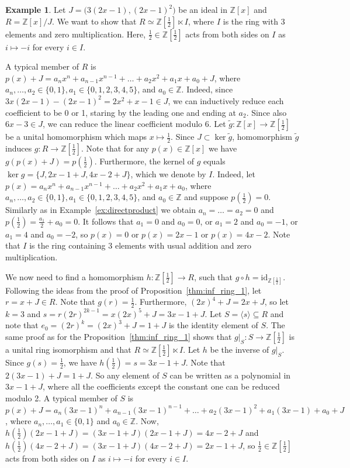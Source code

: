 \documentclass[12pt,a4paper]{amsart}
\theoremstyle{definition}
\newtheorem{example}[proposition]{Example}
\newcommand{\Z}{\mathbb{Z}}
\newcommand{\rng}[1]{\langle #1 \rangle}
\def\id{\mathrm{id}}
\begin{document}
\begin{example}
Let $J = \big(3(2x-1), (2x-1)^2\big)$ be an ideal in $\Z[x]$ and $R = \Z[x]/J$. We want to show that $R \simeq \Z[\frac12] \ltimes I$, where $I$ is the ring with 3 elements and zero multiplication. 
Here, $\frac12 \in \Z[\frac12]$ acts from both sides on $I$ as $i \mapsto -i$ for every $i\in I$.

A typical member of $R$ is $p(x) + J = a_nx^n + a_{n-1}x^{n-1} + \ldots + a_2x^2 + a_1x + a_0 + J$, where $a_n, \ldots, a_2 \in \{0,1\}, a_1 \in \{0,1,2,3,4,5\}$, and $a_0 \in \Z$. 
Indeed, since $3x(2x-1) - (2x-1)^2 = 2x^2+x-1\in J$, we can inductively reduce each coefficient to be 0 or 1, staring by the leading one and ending at $a_2$. Since also $6x -3 \in J$, we can reduce the linear coefficient modulo 6. Let $\tilde{g}\colon \Z[x] \to \Z[\frac12]$ be a unital homomorphism which maps $x \mapsto \frac12$. Since $J \subset \mathop{\mathrm{ker}} \tilde{g}$, homomorphism $\tilde{g}$ induces $g\colon R \to \Z[\frac12]$. 
Note that for any $p(x) \in \Z[x]$ we have $g(p(x)+J) = p(\frac12)$. Furthermore, the kernel of $g$ equals $\mathop{\mathrm{ker}} g = \{J, 2x-1 + J, 4x-2 + J\}$, which we denote by $I$. 
Indeed, let $p(x) = a_nx^n + a_{n-1}x^{n-1} + \ldots + a_2x^2 + a_1x + a_0$, where $a_n, \ldots, a_2 \in \{0,1\}, a_1 \in \{0,1,2,3,4,5\}$, and $a_0 \in \Z$ and suppose $p(\frac12) = 0$. Similarly as in Example~\ref{ex:directproduct} we obtain $a_n= \ldots =a_2=0$ and $p(\frac12) = \frac{a_1}{2} + a_0 =0$. It follows that $a_1 =0$ and $a_0=0$, or $a_1=2$ and $a_0=-1$, or $a_1=4$ and $a_0=-2$, so $p(x) = 0$ or $p(x) = 2x-1$ or $p(x) = 4x-2$. Note that $I$ is the ring containing 3 elements with usual addition and zero multiplication. 

We now need to find a homomorphism $h\colon \Z[\frac12] \to R$, such that $g \circ h = \id_{\Z[\frac12]}$. 
Following the ideas from the proof of Proposition~\ref{thm:inf_ring_1}, let $r = x + J \in R$. Note that $g(r) = \frac12$. Furthermore, $(2x)^4 + J = 2x + J$, so let $k=3$ and $s = r(2r)^{2k-1} = x(2x)^5 + J = 3x-1 + J$. Let $S = \rng{s} \subseteq R$ and note that $e_0 = (2r)^k = (2x)^3 + J = 1 + J$ is the identity element of $S$. The same proof as for the Proposition~\ref{thm:inf_ring_1} shows that $g|_S \colon S \to \Z[\frac12]$ is a unital ring isomorphism and that $R \simeq \Z[\frac12] \ltimes I$. Let $h$ be the inverse of $g|_S$. 
Since $g(s) = \frac12$, we have $h(\frac12) = s = 3x-1 + J$.
Note that $2(3x-1) + J = 1 + J$. So any element of $S$ can be written as a polynomial in $3x-1 +J$, where all the coefficients except the constant one can be reduced modulo 2. A typical member of $S$ is $p(x) + J = a_n(3x-1)^n + a_{n-1}(3x-1)^{n-1} + \ldots + a_2(3x-1)^2 + a_1(3x-1) + a_0 + J$, where $a_n, \ldots, a_1 \in \{0,1\}$ and $a_0 \in \Z$. Now, $h(\frac12)(2x-1 + J) = (3x-1 + J)(2x-1 + J) = 4x-2 + J$ and $h(\frac12)(4x-2 + J) = (3x-1 + J)(4x-2 + J) = 2x-1 + J$, so $\frac12 \in \Z[\frac12]$ acts from both sides on $I$ as $i \mapsto -i$ for every $i\in I$.



\end{example}
\end{document}
